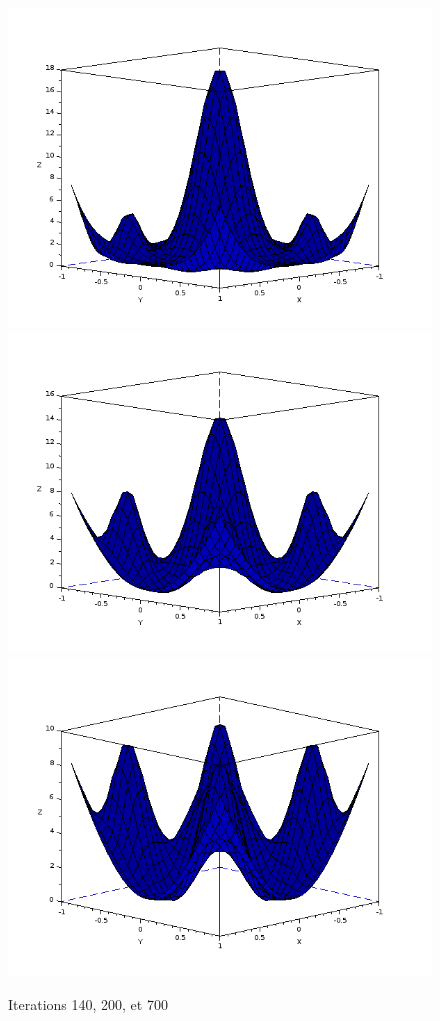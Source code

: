 \documentclass[12pt,a4paper,twoside]{article}
\begin{document}
\begin{figure}
\begin{center}
\includegraphics[scale=0.35]{Images/iter.png}
\includegraphics[scale=0.35]{Images/iter2.png}
\includegraphics[scale=0.35]{Images/iter3.png}
\caption{Iterations 140, 200, et 700}
\label{iterations}
\end{center}
\end{figure}
\end{document}
